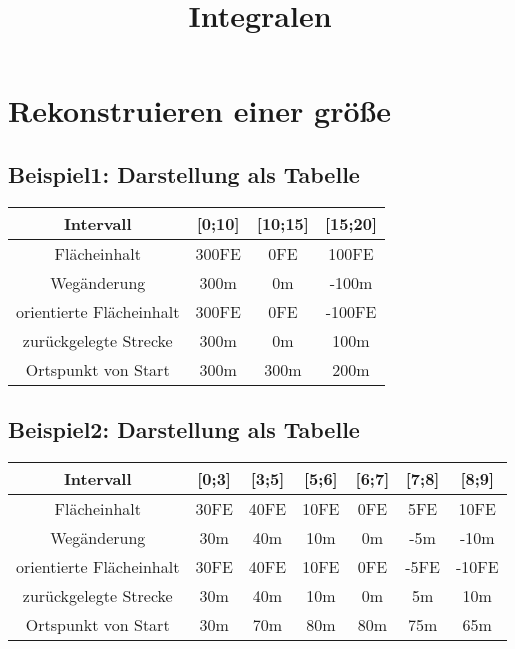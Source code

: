 \documentclass{article}
\title{Integralen}
\begin{document}
\section{Rekonstruieren einer größe}

\subsection{Beispiel1: Darstellung als Tabelle}

\begin{center}
\begin{tabular}{ | c || c | c | c | }
\hline
Intervall & [0;10] & [10;15] & [15;20] \\
\hline \hline
Flächeinhalt & 300FE & 0FE & 100FE\\
\hline
Wegänderung & 300m & 0m & -100m\\
\hline
orientierte Flächeinhalt  & 300FE & 0FE & -100FE\\
\hline
zurückgelegte Strecke & 300m &  0m & 100m\\
\hline
Ortspunkt von Start & 300m &  300m & 200m\\
\hline
\end{tabular}
\end{center}

\subsection{Beispiel2: Darstellung als Tabelle}

\begin{center}
\begin{tabular}{ | c || c | c | c | c | c | c | }

\hline
Intervall & [0;3] & [3;5] & [5;6] & [6;7] & [7;8] & [8;9] \\
\hline \hline
Flächeinhalt & 30FE & 40FE & 10FE & 0FE & 5FE & 10FE\\
\hline
Wegänderung & 30m & 40m & 10m & 0m & -5m & -10m\\
\hline
orientierte Flächeinhalt  & 30FE & 40FE & 10FE & 0FE & -5FE & -10FE\\
\hline
zurückgelegte Strecke & 30m & 40m & 10m & 0m & 5m & 10m\\
\hline
Ortspunkt von Start & 30m & 70m & 80m & 80m & 75m & 65m \\
\hline
\end{tabular}
\end{center}
\end{document}
